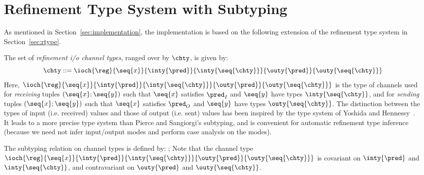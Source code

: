 \section{Refinement Type System with Subtyping}
\label{sec:subtyping}

As mentioned in Section~\ref{sec:implementation},
the implementation is based on the following extension of the refinement type system in Section~\ref{sec:rtype}.

The set of \emph{refinement i/o channel types}, ranged over by $\chty$, is given by:
\[ 
    \chty ::= \ioch{\reg}{\seq{x}}{\inty{\pred}}{\inty{\seq{\chty}}}{\outy{\pred}}{\outy{\seq{\chty}}}
\]
Here, \(\ioch{\reg}{\seq{x}}{\inty{\pred}}{\inty{\seq{\chty}}}{\outy{\pred}}{\outy{\seq{\chty}}}\)
is the type of channels used for \emph{receiving} tuples \((\seq{x};\seq{y})\)
such that \(\seq{x}\) satisfies \(\pred_I\) and \(\seq{y}\) have types
\(\inty{\seq{\chty}}\),
and for \emph{sending} tuples \((\seq{x};\seq{y})\)
such that \(\seq{x}\) satisfies \(\pred_O\) and \(\seq{y}\) have types
\(\outy{\seq{\chty}}\).
The distinction between the types of input (i.e. received) values  and those of
output (i.e. sent) values has been inspired by
the type system of Yoshida and Hennessy~\cite{DBLP:conf/concur/YoshidaH99}.
It leads to a more precise type system than Pierce and Sangiorgi's subtyping,
and is convenient for automatic refinement type inference~\cite{Pierce96MSCS}
(because we need not infer input/output modes and perform case analysis on the modes).

The subtyping relation on channel types is defined by:
{\env;\predenv\p 
    \subtype 
}
Note that the 
 channel type $\ioch{\reg}{\seq{x}}{\inty{\pred}}{\inty{\seq{\chty}}}{\outy{\pred}}{\outy{\seq{\chty}}}$
is covariant on $\inty{\pred}$ and $\inty{\seq{\chty}}$, 
and contravariant on $\outy{\pred}$ and $\outy{\seq{\chty}}$.

